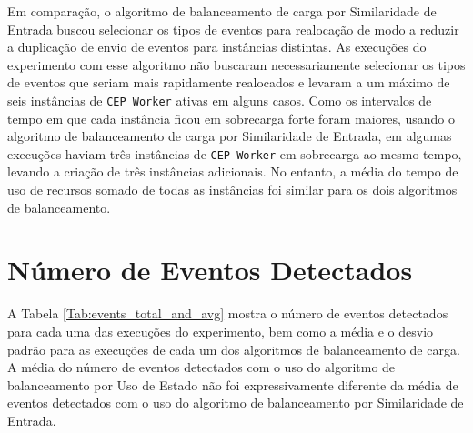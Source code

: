 Em comparação, o algoritmo de balanceamento de carga por Similaridade de Entrada buscou selecionar os tipos de eventos para realocação de modo a reduzir a duplicação de envio de eventos para instâncias distintas. As execuções do experimento com esse algoritmo não buscaram necessariamente selecionar os tipos de eventos que seriam mais rapidamente realocados e levaram a um máximo de seis instâncias de \texttt{CEP Worker} ativas em alguns casos. Como os intervalos de tempo em que cada instância ficou em sobrecarga forte foram maiores, usando o algoritmo de balanceamento de carga por Similaridade de Entrada, em algumas execuções haviam três instâncias de \texttt{CEP Worker} em sobrecarga ao mesmo tempo, levando a criação de três instâncias adicionais. No entanto, a média do tempo de uso de recursos somado de todas as instâncias foi similar para os dois algoritmos de balanceamento.







\section{Número de Eventos Detectados}
\label{sec:number_of_detected_events}


A Tabela \ref{Tab:events_total_and_avg} mostra o número de eventos detectados para cada uma das execuções do experimento, bem como a média e o desvio padrão para as execuções de cada um dos algoritmos de balanceamento de carga. A média do número de eventos detectados com o uso do algoritmo de balanceamento por Uso de Estado não foi expressivamente diferente da média de eventos detectados com o uso do algoritmo de balanceamento por Similaridade de Entrada. %




